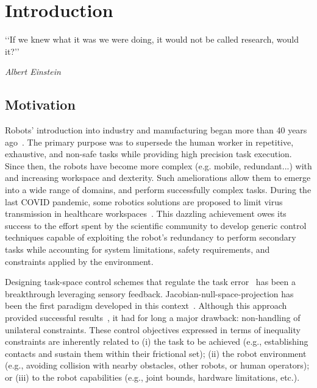 \chapter*{Introduction} \label{chap:introduction}

\setcounter{page}{1}

\epigraph{‘‘If we knew what it was we were doing, it would not be called research, would it?’’}{\emph{Albert Einstein}}
%	
%	
\section*{Motivation}
Robots' introduction into industry and manufacturing began more than 40 years ago~\cite{edwards1984appliedErgonomics}. The primary purpose was to supersede the human worker in repetitive, exhaustive, and non-safe tasks while providing high precision task execution. Since then, the robots have become more complex (e.g. mobile, redundant...) with and increasing workspace and dexterity. Such ameliorations allow them to emerge into a wide range of domains, and perform successfully complex tasks. During the last COVID pandemic, some robotics solutions are proposed to limit virus transmission in healthcare workspaces~\cite{guang-zhong2020scienceRobotics,tavakoli2020ais}. This dazzling achievement owes its success to the effort spent by the scientific community to develop generic control techniques capable of exploiting the robot's redundancy to perform secondary tasks while accounting for system limitations, safety requirements, and constraints applied by the environment.

Designing task-space control schemes that regulate the task error~\cite{samson1991book} has been a breakthrough leveraging sensory feedback. Jacobian-null-space-projection has been the first paradigm developed in this context~\cite{liegeois1977tsmc,siciliano1991icar,deluca1991springer}. 
Although this approach provided successful results~\cite{dietrich2015ijrr}, it had for long a major drawback: non-handling of unilateral constraints. These control objectives expressed in terms of inequality constraints are inherently related to (i) the task to be achieved (e.g., establishing contacts and sustain them within their frictional set); (ii) the robot environment (e.g., avoiding collision with nearby obstacles, other robots, or human operators); or (iii) to the robot capabilities (e.g., joint bounds, hardware limitations, etc.). %


